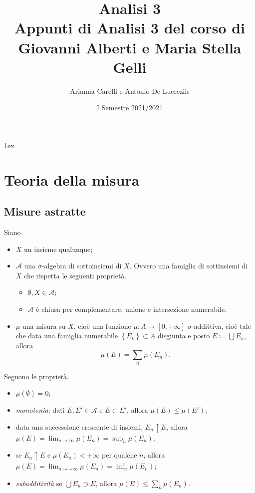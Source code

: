 \documentclass[a4paper, 11pt]{report}
\title{{\Huge Analisi 3}\\{\small Appunti di Analisi 3 del corso di Giovanni Alberti e Maria Stella Gelli}}
\author{Arianna Carelli e Antonio De Lucreziis}
\date{I Semestre 2021/2021}
\begin{document}
%
%
\parskip 1ex
\setlength{\parindent}{0pt}

\maketitle

\tableofcontents
\newpage

\chapter{Teoria della misura}

\section{Misure astratte}
Siano
\begin{itemize}
	\item $X$ un insieme qualunque;
	\item $\mathcal{A}$ una $\sigma$-algebra di sottoinsiemi di $X$. Ovvero una famiglia di sottinsiemi di $X$ che rispetta le seguenti proprietà.
		\begin{itemize}
			\item $\emptyset, X \in \mathcal{A}$;
			\item $\mathcal{A}$ è chiusa per complementare, unione e intersezione numerabile.
			\end{itemize}
	\item $\mu$ una misura su $X$, cioè una funzione $\mu \colon A \to [0,+\infty]$ $\sigma$-addittiva, cioè tale che data una famiglia numerabile $\left\{ E_k \right\} \subset A$ disgiunta e posto $E \coloneqq \bigcup E_n $, allora
	\[
		\mu(E) = \sum_{n} \mu (E_n).
	\] 
\end{itemize}
%
Seguono le proprietà.
\begin{itemize}
	\item $\mu(\emptyset) = 0$;
	\item \textit{monotonia:} dati $E,E' \in \mathcal{A}$ e $E \subset E'$, allora $\mu(E) \leq \mu(E')$;
	\item data una successione crescente di insiemi, $E_n \uparrow E$, allora $\mu(E) = \lim_{n \to \infty} \mu(E_n) = \sup_{n} \mu(E_n)$;
	\item se $E_n \uparrow E$ e $\mu (E_{\overline{n}}) < +\infty$ per qualche $\overline{n}$, allora $\mu(E) = \lim_{n \to + \infty} \mu(E_n) = \inf_{n} \mu(E_n)$;
	\item \textit{subadditività} se $\bigcup E_n \supset E$, allora $\mu(E) \leq \sum_{n}^{} \mu(E_n)$.
\end{itemize}
\end{document}
